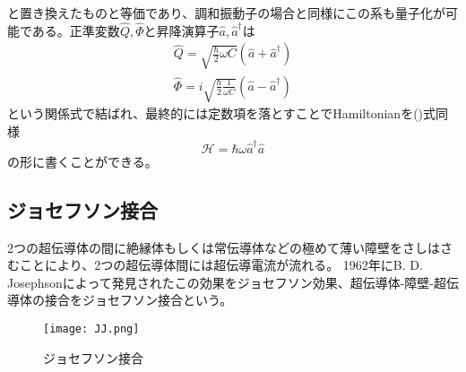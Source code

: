         と置き換えたものと等価であり、調和振動子の場合と同様にこの系も量子化が可能である。正準変数$\hat{Q},\hat{\Phi}$と昇降演算子$\hat{a},\hat{a}^\dagger$は
        \begin{eqnarray}
            \hat{Q}=\sqrt{\frac{\hbar}{2}\omega C}(\hat{a}+\hat{a}^\dagger)\\
            \hat{\Phi}=i\sqrt{\frac{\hbar}{2}\frac{1}{\omega C}}(\hat{a}-\hat{a}^\dagger)
        \end{eqnarray}
        という関係式で結ばれ、最終的には定数項を落とすことでHamiltonianを()式同様
        \begin{equation}
            \mathcal{H}=\hbar\omega\hat{a}^\dagger\hat{a}
        \end{equation}
        の形に書くことができる。
        \subsection{ジョセフソン接合}
        2つの超伝導体の間に絶縁体もしくは常伝導体などの極めて薄い障壁をさしはさむことにより、2つの超伝導体間には超伝導電流が流れる。
        1962年にB. D. Josephsonによって発見されたこの効果をジョセフソン効果、超伝導体-障壁-超伝導体の接合をジョセフソン接合という。\\

        \begin{figure}[H]
            \begin{center}
                \texttt{[image: JJ.png]}
                \caption{ジョセフソン接合}
            \end{center}
        \end{figure}

